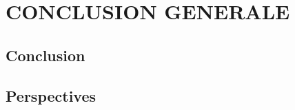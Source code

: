 \documentclass[
10pt, %
a4paper, %
oneside, %
headinclude,footinclude, %
BCOR5mm, %
]{report}
\begin{document}
		\newpage
		\section{CONCLUSION GENERALE}
		\subsection{Conclusion}
		\lipsum[10]
		\subsection{Perspectives}
		\lipsum[10]
										  
										  
														  
																
		\newpage
		\listoffigures %
		\newpage
		\listoftables %
										  
											
																
																
		\renewcommand{\refname}{\spacedlowsmallcaps{References}} %
		\newpage 
		
																
																
																
\end{document}
